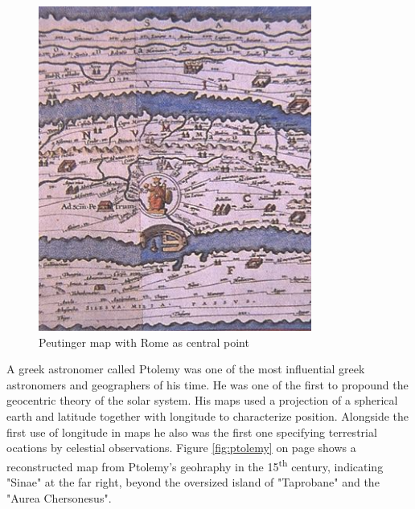 \begin{figure}[h]
\centering
\includegraphics[width=0.8\textwidth,keepaspectratio]{images/history/peutinger_rom.jpg}
\caption[
    Peutinger map with Rome as central point, Urldate: 07.2016 \newline
\small\texttt{\url{https://web.archive.org/web/20060106224928/http://www.kargi.de/Geschichte/Peutinger/peutinger_rom.jpg}}
]{Peutinger map with Rome as central point}
\label{fig:peutinger-rome}
\end{figure}

A greek astronomer called Ptolemy was one of the most influential greek astronomers and geographers of his time. He was one of the first to propound the geocentric theory of the solar system. His maps used a projection of a spherical earth and latitude together with longitude to characterize position. Alongside the first use of longitude in maps he also was the first one specifying terrestrial ocations by celestial observations. Figure \ref{fig:ptolemy} on page \pageref{fig:ptolemy} shows a reconstructed map from Ptolemy's geohraphy in the 15\textsuperscript{th} century, indicating "Sinae" at the far right, beyond the oversized island of "Taprobane" and the "Aurea Chersonesus".


